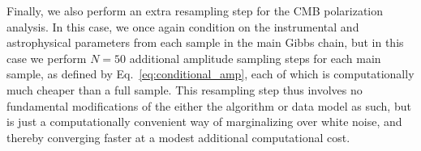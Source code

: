 \documentclass[twocolumn]{aa}
\begin{document}
Finally, we also perform an extra resampling step for the CMB
polarization analysis. In this case, we once again condition on the
instrumental and astrophysical parameters from each sample in the main
Gibbs chain, but in this case we perform $N=50$ additional amplitude
sampling steps for each main sample, as defined by
Eq.~\eqref{eq:conditional_amp}, each of which is computationally much
cheaper than a full sample. This resampling step thus involves no
fundamental modifications of the either the algorithm or data model as
such, but is just a computationally convenient way of marginalizing
over white noise, and thereby converging faster at a modest additional
computational cost.

\end{document}
